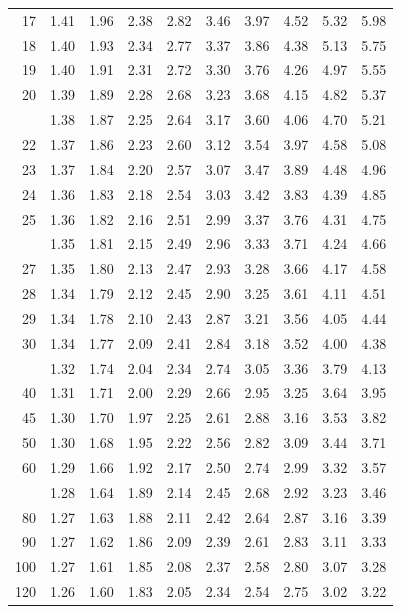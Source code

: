 \documentclass[10pt]{article}
\begin{document}
\begin{longtable}{@{}r!{\vrule width 0.8pt\hspace{0.55em}}rrrrrrrrr@{}}
17 & 1.41 & 1.96 & 2.38 & 2.82 & 3.46 & 3.97 & 4.52 & 5.32 & 5.98 \\
18 & 1.40 & 1.93 & 2.34 & 2.77 & 3.37 & 3.86 & 4.38 & 5.13 & 5.75 \\
19 & 1.40 & 1.91 & 2.31 & 2.72 & 3.30 & 3.76 & 4.26 & 4.97 & 5.55 \\
20 & 1.39 & 1.89 & 2.28 & 2.68 & 3.23 & 3.68 & 4.15 & 4.82 & 5.37 \\
 & 1.38 & 1.87 & 2.25 & 2.64 & 3.17 & 3.60 & 4.06 & 4.70 & 5.21 \\
22 & 1.37 & 1.86 & 2.23 & 2.60 & 3.12 & 3.54 & 3.97 & 4.58 & 5.08 \\
23 & 1.37 & 1.84 & 2.20 & 2.57 & 3.07 & 3.47 & 3.89 & 4.48 & 4.96 \\
24 & 1.36 & 1.83 & 2.18 & 2.54 & 3.03 & 3.42 & 3.83 & 4.39 & 4.85 \\
25 & 1.36 & 1.82 & 2.16 & 2.51 & 2.99 & 3.37 & 3.76 & 4.31 & 4.75 \\
 & 1.35 & 1.81 & 2.15 & 2.49 & 2.96 & 3.33 & 3.71 & 4.24 & 4.66 \\
27 & 1.35 & 1.80 & 2.13 & 2.47 & 2.93 & 3.28 & 3.66 & 4.17 & 4.58 \\
28 & 1.34 & 1.79 & 2.12 & 2.45 & 2.90 & 3.25 & 3.61 & 4.11 & 4.51 \\
29 & 1.34 & 1.78 & 2.10 & 2.43 & 2.87 & 3.21 & 3.56 & 4.05 & 4.44 \\
30 & 1.34 & 1.77 & 2.09 & 2.41 & 2.84 & 3.18 & 3.52 & 4.00 & 4.38 \\
 & 1.32 & 1.74 & 2.04 & 2.34 & 2.74 & 3.05 & 3.36 & 3.79 & 4.13 \\
40 & 1.31 & 1.71 & 2.00 & 2.29 & 2.66 & 2.95 & 3.25 & 3.64 & 3.95 \\
45 & 1.30 & 1.70 & 1.97 & 2.25 & 2.61 & 2.88 & 3.16 & 3.53 & 3.82 \\
50 & 1.30 & 1.68 & 1.95 & 2.22 & 2.56 & 2.82 & 3.09 & 3.44 & 3.71 \\
60 & 1.29 & 1.66 & 1.92 & 2.17 & 2.50 & 2.74 & 2.99 & 3.32 & 3.57 \\
 & 1.28 & 1.64 & 1.89 & 2.14 & 2.45 & 2.68 & 2.92 & 3.23 & 3.46 \\
80 & 1.27 & 1.63 & 1.88 & 2.11 & 2.42 & 2.64 & 2.87 & 3.16 & 3.39 \\
90 & 1.27 & 1.62 & 1.86 & 2.09 & 2.39 & 2.61 & 2.83 & 3.11 & 3.33 \\
100 & 1.27 & 1.61 & 1.85 & 2.08 & 2.37 & 2.58 & 2.80 & 3.07 & 3.28 \\
120 & 1.26 & 1.60 & 1.83 & 2.05 & 2.34 & 2.54 & 2.75 & 3.02 & 3.22 \\

\end{longtable}
\end{document}
